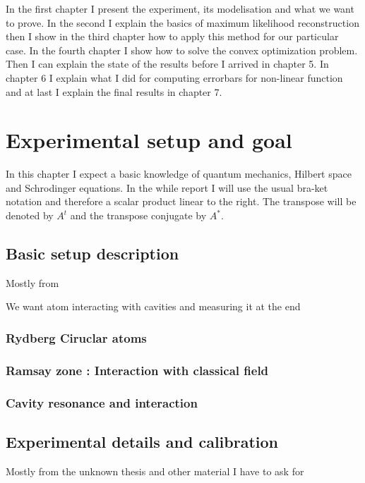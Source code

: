 \documentclass[10pt]{report}
\begin{document}
In the first chapter I
present the experiment, its modelisation and what we want to prove. In the
second I explain the basics of maximum likelihood reconstruction then I show in
the third chapter how to apply this method for our particular case. In the
fourth chapter I show how to solve the convex optimization problem. Then I can
explain the state of the results before I arrived in chapter 5. In chapter 6 I
explain what I did for computing errorbars for non-linear function and at last
I explain the final results in chapter 7.


\chapter{Experimental setup and goal}

In this chapter I expect a basic knowledge of quantum mechanics, Hilbert space and
Schrodinger equations. In the while report I will use the usual bra-ket notation
and therefore a scalar product linear to the right. The transpose will be
denoted by $A^t$ and the transpose conjugate by $A^*$.
\section{Basic setup description}

Mostly from \cite{Har06}

We want atom interacting with cavities and measuring it at the end

\subsection{Rydberg Ciruclar atoms}


\subsection{Ramsay zone : Interaction with classical field}

\subsection{Cavity resonance and interaction}


\section{Experimental details and calibration}

Mostly from the unknown thesis and other material I have to ask for
\end{document}
